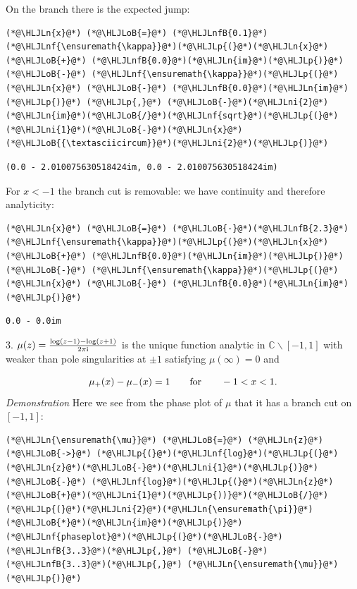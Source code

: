 \documentclass[12pt,a4paper]{article}
\newcommand{\HLJLn}[1]{#1}
\newcommand{\HLJLnf}[1]{\textcolor[RGB]{66,102,213}{#1}}
\newcommand{\HLJLnfB}[1]{\textcolor[RGB]{59,151,46}{#1}}
\newcommand{\HLJLni}[1]{\textcolor[RGB]{59,151,46}{#1}}
\newcommand{\HLJLoB}[1]{\textcolor[RGB]{102,102,102}{\textbf{#1}}}
\newcommand{\HLJLp}[1]{#1}
\def\qqfor{\qquad\hbox{for}\qquad}
\def\I{ {\rm i} }
\def\C{ {\mathbb C} }
\begin{document}
On the branch there is the expected jump:


\begin{lstlisting}
(*@\HLJLn{x}@*) (*@\HLJLoB{=}@*) (*@\HLJLnfB{0.1}@*)
(*@\HLJLnf{\ensuremath{\kappa}}@*)(*@\HLJLp{(}@*)(*@\HLJLn{x}@*) (*@\HLJLoB{+}@*) (*@\HLJLnfB{0.0}@*)(*@\HLJLn{im}@*)(*@\HLJLp{)}@*) (*@\HLJLoB{-}@*) (*@\HLJLnf{\ensuremath{\kappa}}@*)(*@\HLJLp{(}@*)(*@\HLJLn{x}@*) (*@\HLJLoB{-}@*) (*@\HLJLnfB{0.0}@*)(*@\HLJLn{im}@*)(*@\HLJLp{)}@*) (*@\HLJLp{,}@*) (*@\HLJLoB{-}@*)(*@\HLJLni{2}@*)(*@\HLJLn{im}@*)(*@\HLJLoB{/}@*)(*@\HLJLnf{sqrt}@*)(*@\HLJLp{(}@*)(*@\HLJLni{1}@*)(*@\HLJLoB{-}@*)(*@\HLJLn{x}@*)(*@\HLJLoB{{\textasciicircum}}@*)(*@\HLJLni{2}@*)(*@\HLJLp{)}@*)
\end{lstlisting}

\begin{lstlisting}
(0.0 - 2.010075630518424im, 0.0 - 2.010075630518424im)
\end{lstlisting}


For $x < -1$ the branch cut is removable: we have continuity and therefore analyticity:


\begin{lstlisting}
(*@\HLJLn{x}@*) (*@\HLJLoB{=}@*) (*@\HLJLoB{-}@*)(*@\HLJLnfB{2.3}@*)
(*@\HLJLnf{\ensuremath{\kappa}}@*)(*@\HLJLp{(}@*)(*@\HLJLn{x}@*) (*@\HLJLoB{+}@*) (*@\HLJLnfB{0.0}@*)(*@\HLJLn{im}@*)(*@\HLJLp{)}@*) (*@\HLJLoB{-}@*) (*@\HLJLnf{\ensuremath{\kappa}}@*)(*@\HLJLp{(}@*)(*@\HLJLn{x}@*) (*@\HLJLoB{-}@*) (*@\HLJLnfB{0.0}@*)(*@\HLJLn{im}@*)(*@\HLJLp{)}@*)
\end{lstlisting}

\begin{lstlisting}
0.0 - 0.0im
\end{lstlisting}


3. $\mu(z) = {\log(z -1) - \log(z+1) \over 2 \pi \I}$ is the unique function analytic in $\C \backslash [-1,1]$ with weaker than pole singularities at $\pm 1$ satisfying $\mu(\infty) = 0$ and 

\[
\mu_+(x) - \mu_-(x) = 1 \qqfor -1 < x < 1.
\]
\emph{Demonstration} Here we see from the phase plot of $\mu$ that it has a branch cut on $[-1,1]$:


\begin{lstlisting}
(*@\HLJLn{\ensuremath{\mu}}@*) (*@\HLJLoB{=}@*) (*@\HLJLn{z}@*) (*@\HLJLoB{->}@*) (*@\HLJLp{(}@*)(*@\HLJLnf{log}@*)(*@\HLJLp{(}@*)(*@\HLJLn{z}@*)(*@\HLJLoB{-}@*)(*@\HLJLni{1}@*)(*@\HLJLp{)}@*) (*@\HLJLoB{-}@*) (*@\HLJLnf{log}@*)(*@\HLJLp{(}@*)(*@\HLJLn{z}@*)(*@\HLJLoB{+}@*)(*@\HLJLni{1}@*)(*@\HLJLp{))}@*)(*@\HLJLoB{/}@*)(*@\HLJLp{(}@*)(*@\HLJLni{2}@*)(*@\HLJLn{\ensuremath{\pi}}@*)(*@\HLJLoB{*}@*)(*@\HLJLn{im}@*)(*@\HLJLp{)}@*)
(*@\HLJLnf{phaseplot}@*)(*@\HLJLp{(}@*)(*@\HLJLoB{-}@*)(*@\HLJLnfB{3..3}@*)(*@\HLJLp{,}@*) (*@\HLJLoB{-}@*)(*@\HLJLnfB{3..3}@*)(*@\HLJLp{,}@*) (*@\HLJLn{\ensuremath{\mu}}@*)(*@\HLJLp{)}@*)
\end{lstlisting}
\end{document}
